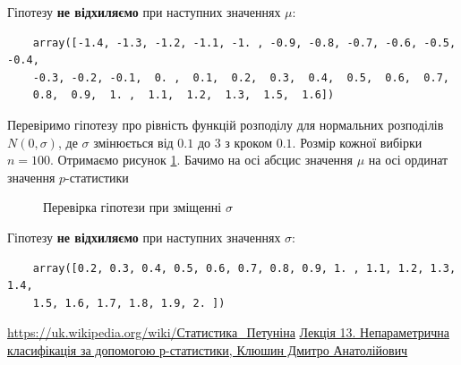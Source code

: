 \documentclass[a4paper,12pt]{article}
\begin{document}
Гіпотезу \textbf{не відхиляємо} при наступних значеннях $\mu$:
\begin{verbatim}
	array([-1.4, -1.3, -1.2, -1.1, -1. , -0.9, -0.8, -0.7, -0.6, -0.5, -0.4,
	-0.3, -0.2, -0.1,  0. ,  0.1,  0.2,  0.3,  0.4,  0.5,  0.6,  0.7,
	0.8,  0.9,  1. ,  1.1,  1.2,  1.3,  1.5,  1.6])
\end{verbatim}

Перевіримо гіпотезу про рівність функцій розподілу для нормальних розподілів $N(0, \sigma)$, де $\sigma$ змінюється від $0.1$ до $3$ з кроком $0.1$. Розмір кожної вибірки $n =100$. Отримаємо рисунок \ref{fig:f2}. Бачимо на осі абсцис значення $\mu$ на осі ординат значення $p$-статистики

\newpage
\begin{figure}[ht]
	\caption{Перевірка гіпотези при зміщенні $\sigma$}
	\label{fig:f2}
\end{figure}

Гіпотезу \textbf{не відхиляємо} при наступних значеннях $\sigma$:
\begin{verbatim}
	array([0.2, 0.3, 0.4, 0.5, 0.6, 0.7, 0.8, 0.9, 1. , 1.1, 1.2, 1.3, 1.4,
	1.5, 1.6, 1.7, 1.8, 1.9, 2. ])
\end{verbatim}

\begin{thebibliography}{}
	 \href{https://uk.wikipedia.org/wiki/%D0%A1%D1%82%D0%B0%D1%82%D0%B8%D1%81%D1%82%D0%B8%D0%BA%D0%B0_%D0%9F%D0%B5%D1%82%D1%83%D0%BD%D1%96%D0%BD%D0%B0}{https://uk.wikipedia.org/wiki/Статистика\_Петуніна}
	 \href{http://om.univ.kiev.ua/users_upload/15/upload/file/pr_lecture_13.pdf}{Лекція 13. Непараметрична класифікація за допомогою р-статистики, Клюшин Дмитро Анатолійович}
\end{thebibliography}
\end{document}
